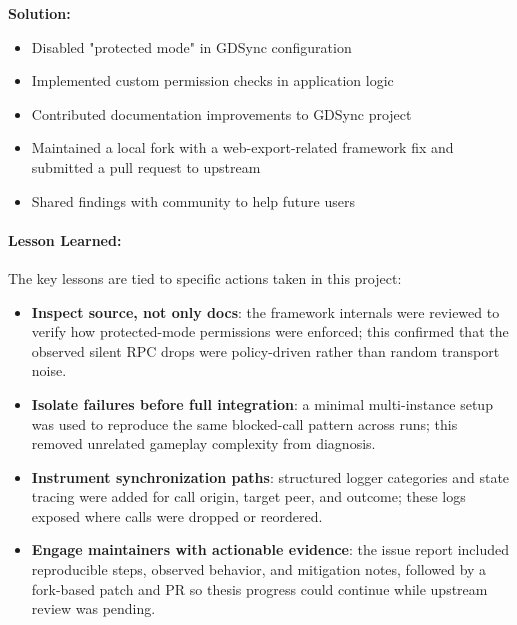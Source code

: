 \textbf{Solution:}

\begin{itemize}
    \item Disabled "protected mode" in GDSync configuration
    \item Implemented custom permission checks in application logic
    \item Contributed documentation improvements to GDSync project
    \item Maintained a local fork with a web-export-related framework fix and submitted a pull request to upstream
    \item Shared findings with community to help future users
\end{itemize}

\paragraph*{Lesson Learned:}


The key lessons are tied to specific actions taken in this project:
\begin{itemize}
    \item \textbf{Inspect source, not only docs}: the framework internals were reviewed to verify how protected-mode permissions were enforced; this confirmed that the observed silent RPC drops were policy-driven rather than random transport noise.
    \item \textbf{Isolate failures before full integration}: a minimal multi-instance setup was used to reproduce the same blocked-call pattern across runs; this removed unrelated gameplay complexity from diagnosis.
    \item \textbf{Instrument synchronization paths}: structured logger categories and state tracing were added for call origin, target peer, and outcome; these logs exposed where calls were dropped or reordered.
    \item \textbf{Engage maintainers with actionable evidence}: the issue report included reproducible steps, observed behavior, and mitigation notes, followed by a fork-based patch and PR so thesis progress could continue while upstream review was pending.
\end{itemize}

